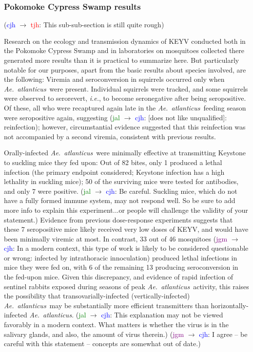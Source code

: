 \documentclass[12pt]{article}
\newcommand{\atl}{\textit{Ae.\ atlanticus}}
\newcommand{\ie}{\textit{i.e.}}
\newcommand{\cjh}{\textcolor{blue}{cjh}}
\newcommand{\tjh}{\textcolor{red}{tjh}}
\newcommand{\jal}{\textcolor{green}{jal}}
\newcommand{\jgm}{\textcolor{purple}{jgm}}
\newcommand{\msg}[3]{(#1 $\rightarrow$ #2: #3)}
\newcommand{\mct}[1]{\msg\cjh\tjh{#1}}
\newcommand{\mjc}[1]{\msg\jal\cjh{#1}}
\newcommand{\mgc}[1]{\msg\jgm\cjh{#1}}
\begin{document}
            \subsubsection{Pokomoke Cypress Swamp results}
                \label{pokomoke-results}
                \mct{This sub-sub-section is still quite rough}

                Research on the ecology and transmission dynamics of KEYV conducted both in the Pokomoke Cypress Swamp and in laboratories on mosquitoes collected there generated more results than it is practical to summarize here. But particularly notable for our purposes, apart from the basic results about species involved, are the following: Viremia and seroconversion in squirrels occurred only when \atl\ were present.\cite{watts1988maintenance} Individual squirrels were tracked, and some squirrels were observed to serorevert, \ie, to become seronegative after being seropositive. Of these, all who were recaptured again late in the \atl\ feeding season were seropositive again, suggesting \mjc{[does not like unqualified]: reinfection}; however, circumstantial evidence suggested that this reinfection was not accompanied by a second viremia\cite{watts1988maintenance}, consistent with previous results\cite{watts1979experimental}.
                
                Orally-infected \atl\ were minimally effective at transmitting Keystone to suckling mice they fed upon: Out of 82 bites, only 1 produced a lethal infection (the primary endpoint considered; Keystone infection has a high lethality in suckling mice); 50 of the surviving mice were tested for antibodies, and only 7 were positive.\cite{watts1988maintenance} \mjc{Be careful. Suckling mice, which do not have a fully formed immune system, may not respond well.   So be sure to add more info to explain this experiment...or people will challenge the validity of your statement.} Evidence from previous dose-response experiments suggests that these 7 seropositive mice likely received very low doses of KEYV, and would have been minimally viremic at most. In contrast, 33 out of 46 mosquitoes \mgc{In a modern context, this type of work is likely to be considered questionable or wrong: infected by intrathoracic innoculation} produced lethal infections in mice they were fed on\cite{watts1988maintenance}, with 6 of the remaining 13 producing seroconversion in the fed-upon mice. Given this discrepancy, and evidence of rapid infection of sentinel rabbits exposed during seasons of peak \atl\ activity\cite{jennings1968california,leduc1978natural}, this raises the possibility that transovarially-infected (vertically-infected) \atl\ may be substantially more efficient transmitters than horizontally-infected \atl. \mjc{This explanation may not be viewed favorably in a modern context. What matters is whether the virus is in the salivary glands, and also, the amount of virus therein.} \mgc{I agree – be careful with this statement – concepts are somewhat out of date.}
            
\end{document}
